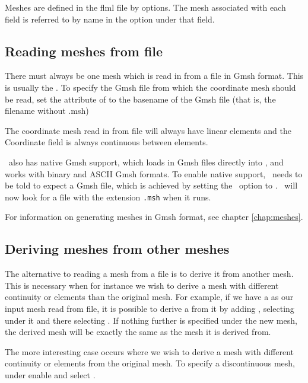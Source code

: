 Meshes are defined in the flml file by  options. The
mesh associated with each field is referred to by name in the
 option under that field.

\subsection{Reading meshes from file}
There must always be one mesh which is read in from a file in
Gmsh format. This is usually the . To specify the
Gmsh file from which the coordinate mesh should be read, set the
 attribute of
 to the basename
of the Gmsh file (that is, the filename without .msh)

The coordinate mesh read in from file will always have linear elements and
the Coordinate field is always continuous between elements.

\fluidity\ also has native Gmsh support, which loads in Gmsh files directly into
\fluidity, and works with binary and ASCII Gmsh formats. To enable native 
support, \fluidity\ needs to be told to expect a Gmsh file, which is achieved 
by setting the \onlypdf{}\ option 
to \onlypdf{}.  \fluidity\ will now look for a file with the extension 
\lstinline[language=bash]+.msh+ when it runs.

For information on generating meshes in Gmsh format, see chapter
\ref{chap:meshes}. 

\subsection{Deriving meshes from other meshes}
The alternative to reading a mesh from a file is to derive it from another
mesh. This is necessary when for instance we wish to derive a mesh with
different continuity or elements than the original mesh. 
For example, if we have a  as our input mesh read 
from file, it is possible to derive a  from it
by adding , selecting 
 under it and there selecting
. If nothing further is specified 
under the new mesh, the derived mesh will be exactly the same as the mesh
it is derived from.

The more interesting case occurs where we wish to derive a mesh with
different continuity or elements from the original mesh. To specify a
discontinuous mesh, under  enable
 and select .

